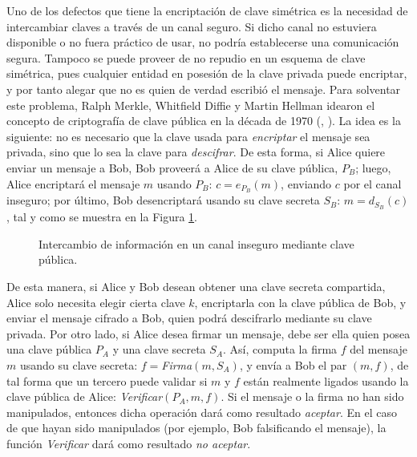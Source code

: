 Uno de los defectos que tiene la encriptación de clave simétrica es la necesidad de intercambiar claves a través de un canal seguro. Si dicho canal no estuviera disponible o no fuera práctico de usar, no podría establecerse una comunicación segura. Tampoco se puede proveer de no repudio en un esquema de clave simétrica, pues cualquier entidad en posesión de la clave privada puede encriptar, y por tanto alegar que no es quien de verdad escribió el mensaje. Para solventar este problema, Ralph Merkle, Whitfield Diffie y Martin Hellman idearon el concepto de criptografía de clave pública en la década de 1970 (\cite{merkle_puzzles}, \cite{diffie1976new}). La idea es la siguiente: no es necesario que la clave usada para \textit{encriptar} el mensaje sea privada, sino que lo sea la clave para \textit{descifrar}. De esta forma, si Alice quiere enviar un mensaje a Bob, Bob proveerá a Alice de su clave pública, $P_B$; luego, Alice encriptará el mensaje $m$ usando $P_B$: $c = e_{P_B}(m)$, enviando $c$ por el canal inseguro; por último, Bob desencriptará usando su clave secreta $S_B$: $m = d_{S_B}(c)$, tal y como se muestra en la Figura \ref{fig:clave_publica_basico}.

\begin{figure}[H]
\centering


\caption{Intercambio de información en un canal inseguro mediante clave pública.}
\label{fig:clave_publica_basico}

\end{figure}

De esta manera, si Alice y Bob desean obtener una clave secreta compartida, Alice solo necesita elegir cierta clave $k$, encriptarla con la clave pública de Bob, y enviar el mensaje cifrado a Bob, quien podrá descifrarlo mediante su clave privada. Por otro lado, si Alice desea firmar un mensaje, debe ser ella quien posea una clave pública $P_A$ y una clave secreta $S_A$. Así, computa la firma $f$ del mensaje $m$ usando su clave secreta: $f = $\textit{Firma}$(m,S_A)$, y envía a Bob el par $(m,f)$, de tal forma que un tercero puede validar si $m$ y $f$ están realmente ligados usando la clave pública de Alice: \textit{Verificar}$(P_A, m, f)$. Si el mensaje o la firma no han sido manipulados, entonces dicha operación dará como resultado \textit{aceptar}. En el caso de que hayan sido manipulados (por ejemplo, Bob falsificando el mensaje), la función \textit{Verificar} dará como resultado \textit{no aceptar}.

